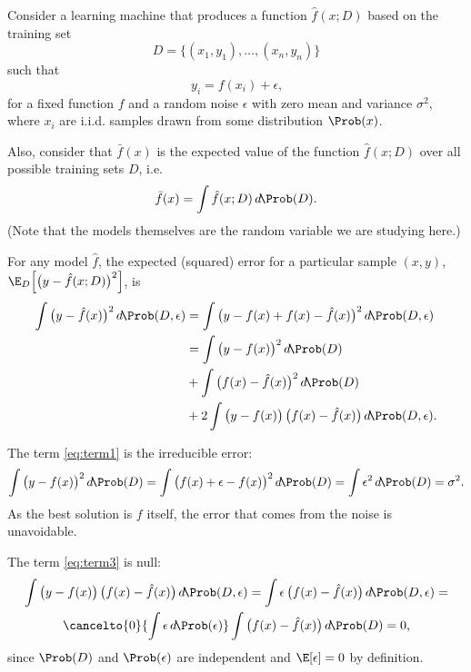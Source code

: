 Consider a learning machine that produces a function $\hat{f}(x; D)$ based on the
training set $$D = \big\{(x_1, y_1), \dots, (x_n, y_n)\big\}$$ such that
\[
  y_i = f(x_i) + \epsilon\text{,}
\]
for a fixed function $f$ and a random noise $\epsilon$ with zero mean and variance
$\sigma^2$, where $x_i$ are i.i.d. samples drawn from some distribution $\Prob(x)$.

Also, consider that $\bar{f}(x)$ is the expected value of the function $\hat{f}(x; D)$
over all possible training sets $D$, i.e.
\[
  \bar{f}(x) = \int \hat{f}(x; D)\, d\!\Prob(D)\text{.}
\]
(Note that the models themselves are the random variable we are studying here.)

For any model $\hat{f}$, the expected (squared) error for a particular sample $(x, y)$,
$\E_D\!\left[ \big( y - \hat{f}(x; D) \big)^2 \right]$, is
\begin{align}
  \notag \int \big( y - \hat{f}(x) \big)^2\, d\!\Prob(D, \epsilon)
    &= \int \big( y - f(x) + f(x) - \hat{f}(x) \big)^2\, d\!\Prob(D, \epsilon) \\
    &= \label{eq:term1}\int \big( y - f(x) \big)^2\, d\!\Prob(D) \\
    &+ \label{eq:term2}\int \big( f(x) - \hat{f}(x) \big)^2\, d\!\Prob(D) \\
    &+ \label{eq:term3}2 \int \big( y - f(x) \big)\,\big( f(x) - \hat{f}(x) \big)\, d\!\Prob(D, \epsilon)\text{.}
\end{align}

The term \eqref{eq:term1} is the irreducible error:
\begin{equation}
  \label{eq:irreducible-error}
  \int \big( y - f(x) \big)^2\, d\!\Prob(D) =
  \int \big( f(x) + \epsilon - f(x) \big)^2\, d\!\Prob(D) =
  \int \epsilon^2\, d\!\Prob(D) = \sigma^2\text{.}
\end{equation}
As the best solution is $f$ itself, the error that comes from the noise is unavoidable.

The term \eqref{eq:term3} is null:
\begin{multline*}
  \int \big( y - f(x) \big)\,\big( f(x) - \hat{f}(x) \big)\, d\!\Prob(D, \epsilon) =
  \int \epsilon\,\big( f(x) - \hat{f}(x) \big)\, d\!\Prob(D, \epsilon) = \\
  \cancelto{0}{\int \epsilon\, d\!\Prob(\epsilon)} \int \big( f(x) - \hat{f}(x) \big)\, d\!\Prob(D) = 0\text{,}
\end{multline*}
since $\Prob(D)$ and $\Prob(\epsilon)$ are independent and $\E[\epsilon] = 0$ by
definition.

